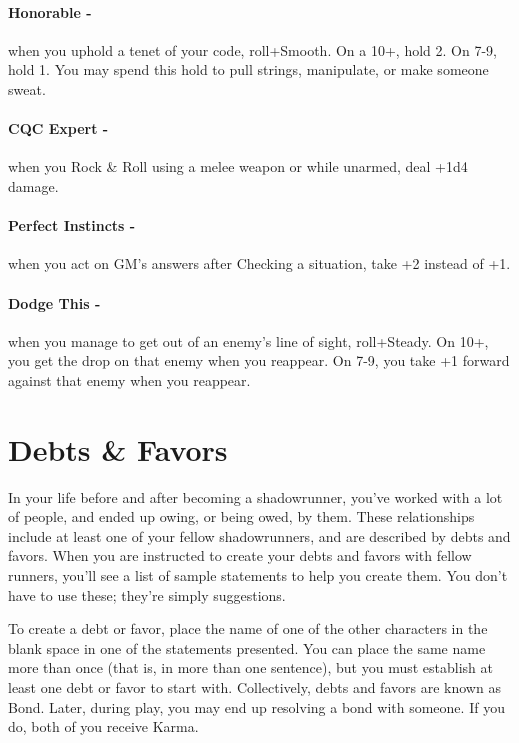 \paragraph{Honorable -} when you uphold a tenet of your code, roll+Smooth. On a 10+, hold 2. On 7-9, hold 1. You may spend this hold to pull strings, manipulate, or make someone sweat.

\paragraph{CQC Expert -} when you Rock \& Roll using a melee weapon or while unarmed, deal +1d4 damage.

\paragraph{Perfect Instincts -} when you act on GM’s answers after Checking a situation, take +2 instead of +1.

\paragraph{Dodge This -} when you manage to get out of an enemy’s line of sight, roll+Steady. On 10+, you get the drop on that enemy when you reappear. On 7-9, you take +1 forward against that enemy when you reappear.


\clearpage
\section{Debts \& Favors}

In your life before and after becoming a shadowrunner, you’ve worked with a lot of people, and ended up owing, or being owed, by them. These relationships include at least one of your fellow shadowrunners, and are described by debts and favors. When you are instructed to create your debts and favors with fellow runners, you’ll see a list of sample statements to help you create them. You don’t have to use these; they’re simply suggestions.
    
To create a debt or favor, place the name of one of the other characters in the blank space in one of the statements presented. You can place the same name more than once (that is, in more than one sentence), but you must establish at least one debt or favor to start with. Collectively, debts and favors are known as Bond. Later, during play, you may end up resolving a bond with someone. If you do, both of you receive Karma.